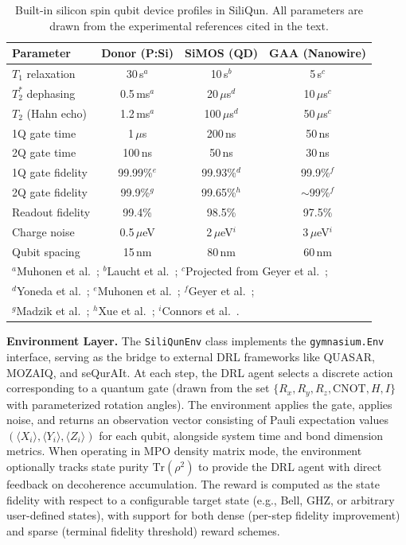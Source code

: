\documentclass[preprint,12pt, a4paper]{elsarticle}
\begin{document}
\begin{table}[htbp]
\centering
\caption{Built-in silicon spin qubit device profiles in SiliQun. All parameters are drawn from the experimental references cited in the text.}
\label{tab:devices}
\begin{tabular}{lccc}
\toprule
\textbf{Parameter} & \textbf{Donor (P:Si)} & \textbf{SiMOS (QD)} & \textbf{GAA (Nanowire)} \\
\midrule
$T_1$ relaxation & 30\,s$^a$ & 10\,s$^b$ & 5\,s$^c$ \\
$T_2^*$ dephasing & 0.5\,ms$^a$ & 20\,$\mu$s$^d$ & 10\,$\mu$s$^c$ \\
$T_2$ (Hahn echo) & 1.2\,ms$^a$ & 100\,$\mu$s$^d$ & 50\,$\mu$s$^c$ \\
1Q gate time & 1\,$\mu$s & 200\,ns & 50\,ns \\
2Q gate time & 100\,ns & 50\,ns & 30\,ns \\
1Q gate fidelity & 99.99\%$^e$ & 99.93\%$^d$ & 99.9\%$^f$ \\
2Q gate fidelity & 99.9\%$^g$ & 99.65\%$^h$ & $\sim$99\%$^f$ \\
Readout fidelity & 99.4\% & 98.5\% & 97.5\% \\
Charge noise & 0.5\,$\mu$eV & 2\,$\mu$eV$^i$ & 3\,$\mu$eV$^i$ \\
Qubit spacing & 15\,nm & 80\,nm & 60\,nm \\
\bottomrule
\multicolumn{4}{l}{\footnotesize $^a$Muhonen et al.~\cite{muhonen2014storing}; $^b$Laucht et al.~\cite{laucht2015electrically}; $^c$Projected from Geyer et al.~\cite{geyer2022twoqubit};} \\
\multicolumn{4}{l}{\footnotesize $^d$Yoneda et al.~\cite{yoneda2018quantum}; $^e$Muhonen et al.~\cite{muhonen2015quantifying}; $^f$Geyer et al.~\cite{geyer2022twoqubit};} \\
\multicolumn{4}{l}{\footnotesize $^g$Madzik et al.~\cite{madzik2022precision}; $^h$Xue et al.~\cite{xue2022quantum}; $^i$Connors et al.~\cite{connors2022charge}.}
\end{tabular}
\end{table}

\textbf{Environment Layer.} The \texttt{SiliQunEnv} class implements the \texttt{gymnasium.Env} interface, serving as the bridge to external DRL frameworks like QUASAR, MOZAIQ, and seQurAIt. At each step, the DRL agent selects a discrete action corresponding to a quantum gate (drawn from the set $\{R_x, R_y, R_z, \text{CNOT}, H, I\}$ with parameterized rotation angles). The environment applies the gate, applies noise, and returns an observation vector consisting of Pauli expectation values $(\langle X_i \rangle, \langle Y_i \rangle, \langle Z_i \rangle)$ for each qubit, alongside system time and bond dimension metrics. When operating in MPO density matrix mode, the environment optionally tracks state purity $\text{Tr}(\rho^2)$ to provide the DRL agent with direct feedback on decoherence accumulation. The reward is computed as the state fidelity with respect to a configurable target state (e.g., Bell, GHZ, or arbitrary user-defined states), with support for both dense (per-step fidelity improvement) and sparse (terminal fidelity threshold) reward schemes.
\end{document}
